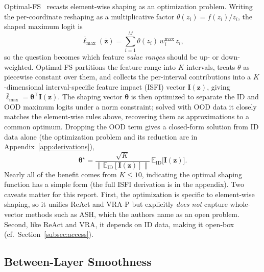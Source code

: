 \documentclass[a4paper]{article}
\begin{document}
Optimal-FS~\citep{optimalfs} recasts element-wise shaping as an optimization
problem. Writing the per-coordinate reshaping as a multiplicative factor
$\theta(z_i) = f(z_i)/z_i$, the shaped maximum logit is
\begin{equation}
\label{eq:optfs}
\bar{\ell}_{\max}(\bar{\mathbf{z}}) = \sum_{i=1}^{M} \theta(z_i)\, w^{\max}_i\, z_i ,
\end{equation}
so the question becomes which feature \emph{value ranges} should be up- or
down-weighted. Optimal-FS partitions the feature range into $K$ intervals, treats
$\theta$ as piecewise constant over them, and collects the per-interval contributions
into a $K$-dimensional interval-specific feature impact (ISFI) vector
$\mathbf{I}(\mathbf{z})$, giving $\bar{\ell}_{\max} = \boldsymbol{\theta}^{\top}
\mathbf{I}(\mathbf{z})$. The shaping vector $\boldsymbol{\theta}$ is then optimized to
separate the ID and OOD maximum logits under a norm constraint; solved with OOD data it
closely matches the element-wise rules above, recovering them as approximations to a
common optimum. Dropping the OOD term gives a closed-form solution from ID data alone (the optimization problem
and its reduction are in Appendix~\ref{app:derivations}),
\begin{equation}
\boldsymbol{\theta}^{\star} = \frac{\sqrt{K}}
{\big\| \mathbb{E}_{\mathrm{ID}}[\mathbf{I}(\mathbf{z})] \big\|}\,
\mathbb{E}_{\mathrm{ID}}\big[\mathbf{I}(\mathbf{z})\big] .
\end{equation}
Nearly all of the benefit comes from $K \leq 10$, indicating the optimal shaping
function has a simple form (the full ISFI derivation is in the appendix). Two
caveats matter for this report. First, the optimization is specific to element-wise
shaping, so it unifies ReAct and VRA-P but explicitly \emph{does not} capture
whole-vector methods such as ASH, which the authors name as an open problem.
Second, like ReAct and VRA, it depends on ID data, making it open-box
(cf.\ Section~\ref{subsec:access}).

\subsection{Between-Layer Smoothness}
\label{subsec:blood}
\end{document}
